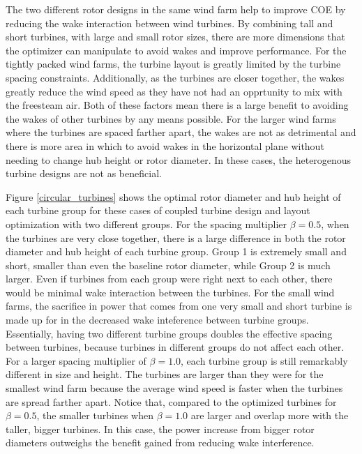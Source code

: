 The two different rotor designs in the same wind farm help to improve COE by reducing the wake interaction between wind turbines. By combining tall and short turbines, with large and small rotor sizes, there are more dimensions that the optimizer can manipulate to avoid wakes and improve performance. For the tightly packed wind farms, the turbine layout is greatly limited by the turbine spacing constraints. Additionally, as the turbines are closer together, the wakes greatly reduce the wind speed as they have not had an opprtunity to mix with the freesteam air. Both of these factors mean there is a large benefit to avoiding the wakes of other turbines by any means possible. For the larger wind farms where the turbines are spaced farther apart, the wakes are not as detrimental and there is more area in which to avoid wakes in the horizontal plane without needing to change hub height or rotor diameter. In these cases, the heterogenous turbine designs are not as beneficial.

Figure \ref{circular_turbines} shows the optimal rotor diameter and hub height of each turbine group for these cases of coupled turbine design and layout optimization with two different groups. For the spacing multiplier $\beta=0.5$, when the turbines are very close together, there is a large difference in both the rotor diameter and hub height of each turbine group. Group 1 is extremely small and short, smaller than even the baseline rotor diameter, while Group 2 is much larger. Even if turbines from each group were right next to each other, there would be minimal wake interaction between the turbines. For the small wind farms, the sacrifice in power that comes from one very small and short turbine is made up for in the decreased wake inteference between turbine groups. Essentially, having two different turbine groups doubles the effective spacing between turbines, because turbines in different groups do not affect each other. For a larger spacing multiplier of $\beta=1.0$, each turbine group is still remarkably different in size and height. The turbines are larger than they were for the smallest wind farm because the average wind speed is faster when the turbines are spread farther apart. Notice that, compared to the optimized turbines for $\beta=0.5$, the smaller turbines when $\beta=1.0$ are larger and overlap more with the taller, bigger turbines. In this case, the power increase from bigger rotor diameters outweighs the benefit gained from reducing wake interference. 


